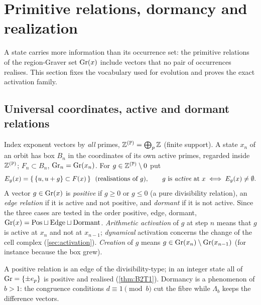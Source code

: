 \section{Primitive relations, dormancy and realization}\label{sec:relations}
A state carries more information than its occurrence set: the primitive relations of the region-Graver set $\mathrm{Gr}(x)$ include vectors that no pair of occurrences realises. This section fixes the vocabulary used for evolution and proves the exact activation family.

\subsection{Universal coordinates, active and dormant relations}
\begin{definition}\label{def:universal}
Index exponent vectors by \emph{all} primes, $\mathbb Z^{(\mathbb P)}=\bigoplus_p\mathbb Z$ (finite support). A state $x_n$ of an orbit has box $B_n$ in the coordinates of its own active primes, regarded inside $\mathbb Z^{(\mathbb P)}$; $F_n\subset B_n$, $\mathrm{Gr}_n=\mathrm{Gr}(x_n)$. For $g\in\mathbb Z^{(\mathbb P)}\setminus0$ put
\[
E_g(x)=\{\,\{u,u+g\}\subset F(x)\,\}\ \ (\text{realisations of }g),\qquad g\text{ is \emph{active} at }x\iff E_g(x)\ne\emptyset .
\]
A vector $g\in\mathrm{Gr}(x)$ is \emph{positive} if $g\ge0$ or $g\le0$ (a pure divisibility relation), an \emph{edge relation} if it is active and not positive, and \emph{dormant} if it is not active. Since the three cases are tested in the order positive, edge, dormant, $\mathrm{Gr}(x)=\mathrm{Pos}\sqcup\mathrm{Edge}\sqcup\mathrm{Dormant}$. \emph{Arithmetic activation} of $g$ at step $n$ means that $g$ is active at $x_n$ and not at $x_{n-1}$; \emph{dynamical} activation concerns the change of the cell complex (\cref{sec:activation}). \emph{Creation} of $g$ means $g\in\mathrm{Gr}(x_n)\setminus\mathrm{Gr}(x_{n-1})$ (for instance because the box grew).
\end{definition}
\begin{remark}
A positive relation is an edge of the divisibility-type; in an integer state all of $\mathrm{Gr}=\{\pm e_p\}$ is positive and realised (\cref{thm:B2T1}). Dormancy is a phenomenon of $b>1$: the congruence conditions $d\equiv1\pmod b$ cut the fibre while $\Lambda_b$ keeps the difference vectors.
\end{remark}

